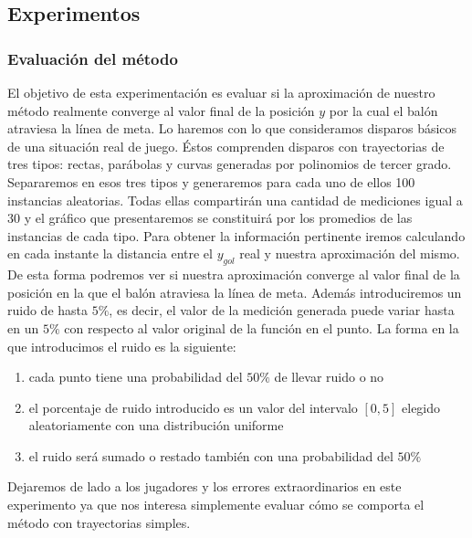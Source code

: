 \subsection{Experimentos}

\subsubsection{Evaluación del método}
El objetivo de esta experimentación es evaluar si la aproximación de nuestro método realmente converge al valor final de 
la posición $y$ por la cual el balón atraviesa la línea de meta. Lo haremos con lo que consideramos disparos básicos de una situación
real de juego. Éstos comprenden disparos con trayectorias de tres tipos: rectas, parábolas y curvas generadas por polinomios de tercer
grado. Separaremos en esos tres tipos y generaremos para cada uno de ellos 100 instancias aleatorias. Todas ellas compartirán 
una cantidad de mediciones igual a 30 y el gráfico que presentaremos se constituirá por los promedios de las instancias de cada tipo. 
Para obtener la información pertinente iremos calculando en cada instante la distancia entre 
el $y_{gol}$ real y nuestra aproximación del mismo. De esta forma podremos ver si nuestra aproximación converge al valor final de 
la posición en la que el balón atraviesa la línea de meta.
Además introduciremos un ruido de hasta $5\%$, es decir, el valor de la medición generada puede variar hasta en un $5\%$ con 
respecto al valor original de la función en el punto. La forma en la que introducimos el ruido es la siguiente:
\begin{enumerate}
	\item cada punto tiene una probabilidad del $50\%$ de llevar ruido o no
	\item el porcentaje de ruido introducido es un valor del intervalo $[0, 5]$ elegido aleatoriamente con una distribución uniforme
	\item el ruido será sumado o restado también con una probabilidad del $50\%$
\end{enumerate}
Dejaremos de lado a los jugadores y los errores extraordinarios en este experimento ya que nos interesa simplemente evaluar cómo se 
comporta el método con trayectorias simples.  

